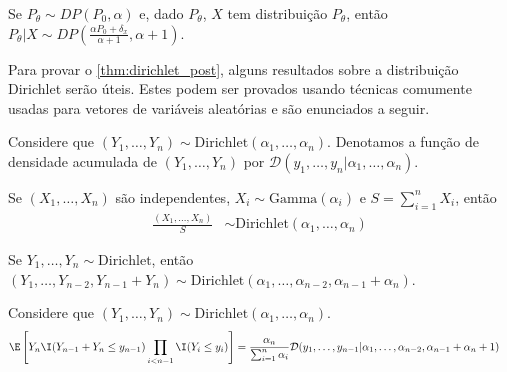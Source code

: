 \begin{theorem}
 \label{thm:dirichlet_post}
 Se $P_{\theta} \sim DP(P_0, \alpha)$ e,
 dado $P_{\theta}$, $X$ tem distribuição $P_{\theta}$,
 então $P_{\theta}|X \sim DP\left(
 \frac{\alpha P_0 + \delta_{x}}
 {\alpha+1}, \alpha+1\right)$.
\end{theorem}

Para provar o \cref{thm:dirichlet_post},
alguns resultados sobre a distribuição
Dirichlet serão úteis.
Estes podem ser provados usando
técnicas comumente usadas para
vetores de variáveis aleatórias e
são enunciados a seguir.

\begin{definition}
 Considere que 
 $(Y_1,\ldots,Y_n)
 \sim \text{Dirichlet}(\alpha_1,\ldots,\alpha_n)$.
 Denotamos a função de densidade acumulada
 de $(Y_1,\ldots,Y_n)$ por
 $\mathcal{D}(y_1,\ldots,y_n|\alpha_1,\ldots,\alpha_n)$.
\end{definition}

\begin{lemma}
 \label{lemma:dirichlet-1}
 Se $(X_1,\ldots,X_n)$ são independentes,
 $X_i \sim \text{Gamma}(\alpha_i)$ e
 $S = \sum_{i=1}^n X_i$, então
 \begin{align*}
  \frac{\left(X_1, \ldots, X_n\right)}{S}
  & \sim \text{Dirichlet}(\alpha_1,\ldots,\alpha_n)
 \end{align*}
\end{lemma}

\begin{lemma}
 \label{lemma:dirichlet-2}
 Se $Y_1,\ldots,Y_n \sim \text{Dirichlet}$, então
 $(Y_1,\ldots,Y_{n-2},Y_{n-1}+Y_{n}) 
 \sim \text{Dirichlet}(\alpha_1,\ldots,\alpha_{n-2},
 \alpha_{n-1}+\alpha_n)$.
\end{lemma}

\begin{lemma}
 \label{lemma:dirichlet-3}
 Considere que
 $(Y_1,\ldots,Y_n)
 \sim \text{Dirichlet}(\alpha_1,\ldots,\alpha_n)$.
 \begin{align*}
  \E\left[Y_{n} \I(Y_{n-1}+Y_{n} \leq y_{n-1})
  \prod_{i < n-1} \I(Y_i \leq y_{i})\right]
  &= \frac{\alpha_n}{\sum_{i=1}^n \alpha_i}
  \mathcal{D}(y_1,\ldots,y_{n-1}|
  \alpha_1,\ldots,\alpha_{n-2},\alpha_{n-1}+\alpha_n+1)
 \end{align*}
\end{lemma}


